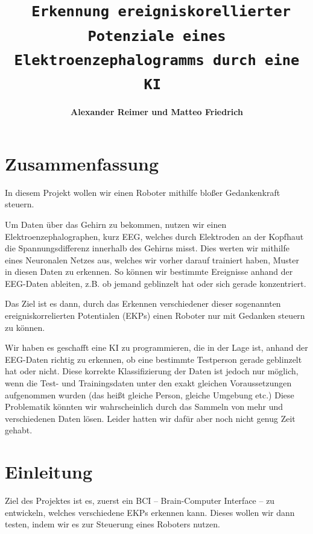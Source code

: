 \documentclass{scrartcl}
\title{\textbf{\Huge 
\texttt{
	Erkennung ereigniskorellierter Potenziale eines Elektroenzephalogramms durch eine KI
}
} \\ \vspace{20mm}}
\date{}
\author[]{\textbf{\huge Alexander Reimer und Matteo Friedrich}}
\affil[]{\textbf{\LARGE Gymnasium Eversten Oldenburg} \\ \vspace{10mm} \textbf{\Large Betreuer: Herr Dr. Glade \& Herr Husemeyer}}
\begin{document}
	\newcommand{\sig}{\textrm{sig}}
	\newcommand{\netin}{\textrm{netzinput}}

	\newcommand{\threesub}[1]{
	\vspace{1.5ex}
	\noindent {\textbf{#1}}
	\vspace{0.5ex}
	}

	\maketitle

	\newpage
	
	\tableofcontents
	
	\newpage

	\section{Zusammenfassung}


	In diesem Projekt wollen wir einen Roboter mithilfe bloßer Gedankenkraft steuern.

	Um Daten über das Gehirn zu bekommen, nutzen wir einen Elektroenzephalographen, kurz EEG, welches durch Elektroden an der Kopfhaut die Spannungsdifferenz innerhalb des Gehirns misst. Dies werten wir mithilfe eines Neuronalen Netzes aus, welches wir vorher darauf trainiert haben, Muster in diesen Daten zu erkennen. So können wir bestimmte Ereignisse anhand der EEG-Daten ableiten, z.B. ob jemand geblinzelt hat oder sich gerade konzentriert.
	
	Das Ziel ist es dann, durch das Erkennen verschiedener dieser sogenannten ereigniskorrelierten Potentialen (EKPs) einen Roboter nur mit Gedanken steuern zu können.
	
	
	Wir haben es geschafft eine KI zu programmieren, die in der Lage ist, anhand der EEG-Daten richtig zu erkennen, ob eine bestimmte Testperson gerade geblinzelt hat oder nicht. Diese korrekte Klassifizierung der Daten ist jedoch nur möglich, wenn die Test- und Trainingsdaten unter den exakt gleichen Voraussetzungen aufgenommen wurden (das heißt gleiche Person, gleiche Umgebung etc.) Diese Problematik könnten wir wahrscheinlich durch das Sammeln von mehr und verschiedenen Daten lösen. Leider hatten wir dafür aber noch nicht genug Zeit gehabt.	

	\section{Einleitung}
 
	Ziel des Projektes ist es, zuerst ein BCI -- Brain-Computer Interface -- zu entwickeln, welches verschiedene EKPs erkennen kann. Dieses wollen wir dann testen, indem wir es zur Steuerung eines Roboters nutzen.
\end{document}
